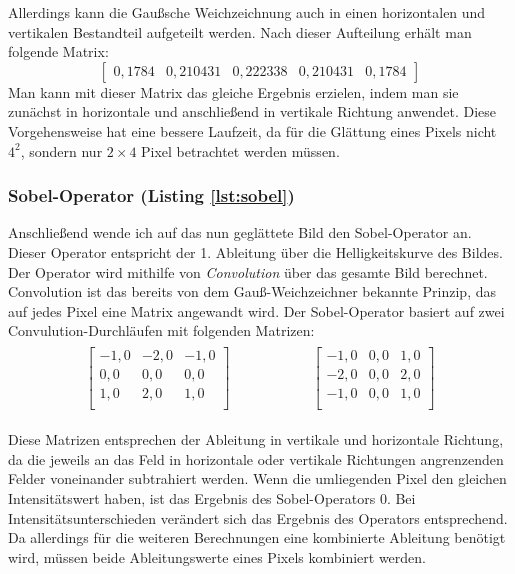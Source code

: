 Allerdings kann die Gaußsche Weichzeichnung auch in einen horizontalen und vertikalen Bestandteil aufgeteilt werden. Nach dieser Aufteilung erhält man folgende Matrix:
\begin{equation}
	\begin{bmatrix}
	0,1784&0,210431&0,222338&0,210431&0,1784
	\end{bmatrix}
\end{equation}
Man kann mit dieser Matrix das gleiche Ergebnis erzielen, indem man sie zunächst in horizontale und anschließend in vertikale Richtung anwendet. Diese Vorgehensweise hat eine bessere Laufzeit, da für die Glättung eines Pixels nicht \(4^2\), sondern nur \(2\times 4\) Pixel betrachtet werden müssen.

\subsubsection{Sobel-Operator (Listing \ref{lst:sobel})}
Anschließend wende ich auf das nun geglättete Bild den Sobel-Operator an. Dieser Operator entspricht der 1. Ableitung über die Helligkeitskurve des Bildes. Der Operator wird mithilfe von \textit{Convolution} über das gesamte Bild berechnet. Convolution ist das bereits von dem Gauß-Weichzeichner bekannte Prinzip, das auf jedes Pixel eine Matrix angewandt wird. Der Sobel-Operator basiert auf zwei Convulution-Durchläufen mit folgenden Matrizen:
\begin{gather}
	\begin{split}
		\begin{bmatrix}
			-1,0&-2,0&-1,0\\
			0,0&0,0&0,0\\
			1,0&2,0&1,0\\
		\end{bmatrix}
	\end{split}
	\hspace{5em}
	\begin{split}
		\begin{bmatrix}
			-1,0&0,0&1,0\\
			-2,0&0,0&2,0\\
			-1,0&0,0&1,0\\
		\end{bmatrix}
	\end{split}
\end{gather}

Diese Matrizen entsprechen der Ableitung in vertikale und horizontale Richtung, da die jeweils an das Feld in horizontale oder vertikale Richtungen angrenzenden Felder voneinander subtrahiert werden.
Wenn die umliegenden Pixel den gleichen Intensitätswert haben, ist das Ergebnis des Sobel-Operators 0.
Bei Intensitätsunterschieden verändert sich das Ergebnis des Operators entsprechend.
Da allerdings für die weiteren Berechnungen eine kombinierte Ableitung benötigt wird, müssen beide Ableitungswerte eines Pixels kombiniert werden.


